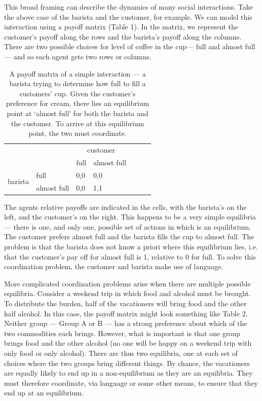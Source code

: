 \documentclass[man, noapacite, 12pt]{apa2}
\begin{document}
This broad framing can describe the dynamics of many social interactions. Take the above case of the barista and the customer, for example. We can model this interaction using a payoff matrix (Table 1). In the matrix, we represent the customer's payoff along the rows and the barista's payoff along the columns. There are two possible choices for  level of coffee in the cup---  full and  almost full --- and so each agent gets two rows or columns. 
\begin{table}[t]
\begin{center}
\begin{tabular}{l p{3cm} l p{3cm} l p{3cm} r}
 &  & \multicolumn{2}{c}{customer} \\ \cline{2-4} 
\multicolumn{1}{l|}{} & \multicolumn{1}{l|}{} & \multicolumn{1}{l|}{full} & \multicolumn{1}{l|}{almost full} \\ \cline{2-4} 
\multicolumn{1}{c|}{\multirow{2}{*}{barista}} & \multicolumn{1}{l|}{full} & \multicolumn{1}{l|}{0,0} & \multicolumn{1}{l|}{0,0} \\ \cline{2-4} 
\multicolumn{1}{c|}{} & \multicolumn{1}{l|}{almost full} & \multicolumn{1}{l|}{0,0} & \multicolumn{1}{l|}{1,1} \\ \cline{2-4} 
\end{tabular}
\caption{A payoff matrix of a simple interaction --- a barista trying to determine how full to fill a customers' cup. Given the customer's preference for cream, there lies an equilibrium point at `almost full' for both the barista and the customer. To arrive at this equilibrium point, the two must coordinate.}
\end{center}
\end{table}
The agents relative payoffs are indicated in the cells, with the barista's on the left, and the customer's on the right. This happens to be a very simple equilibria --- there is one, and only one, possible set of actions in which is an equilibrium. The customer prefers almost full and the barista fills the cup to almost full. The problem is that the barista does not know a priori where this equilibrium lies, i.e. that the customer's pay off for almost full is 1, relative to 0 for full. To solve this coordination problem, the customer and barista make use of language.

More complicated coordination problems arise when there are multiple possible equilibria. Consider a weekend trip in which food and alcohol must be brought. To distribute the burden, half of the vacationers will bring food and the other half alcohol. In this case, the payoff matrix might look something like Table 2. Neither group --- Group A or B --- has a strong preference about which of the two commodities each brings. However, what is important is that one group brings food and the other alcohol (no one will be happy on a weekend trip with only food or only alcohol). There are thus two equilibria, one  at each set of choices where the two groups bring different things. By chance, the vacationers are equally likely to end up in a non-equilibrium as they are an equilibria. They must  therefore coordinate, via language or some other means, to ensure that they end up at an equilibrium.
\end{document}
